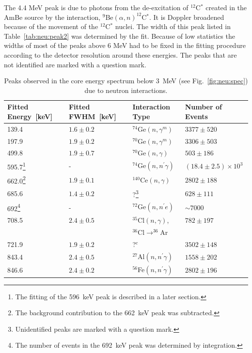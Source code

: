 The 4.4 MeV peak is due to photons from the de-excitation of
$^{12}$C$^{*}$ created in the AmBe source by the interaction,
$^{9}$Be$(\alpha,n)^{12}$C$^{*}$. It is Doppler broadened because of
the movement of the $^{12}$C$^{*}$ nuclei. The width of this peak
listed in Table~\ref{tab:neu:peak2} was determined by the fit. Because
of low statistics the widths of most of the peaks above 6 MeV had to
be fixed in the fitting procedure according to the detector resolution
around these energies. The peaks that are not identified are marked
with a question mark.

\begin{table}[tbhp]
\centering
\caption{Peaks observed in the core energy spectrum below 3~MeV
(see Fig.~\ref{fig:neu:spec}) due to neutron interactions.} 
\label{tab:neu:peak}
\begin{minipage}{\linewidth}
\begin{tabular*}{\textwidth}{llll} \hline
Fitted Energy~[keV]& Fitted FWHM~[keV]& Interaction Type& Number of Events\\\hline
139.4 & $1.6 \pm 0.2$ & $^{74}$Ge$(n,\gamma^m)$ & $3377 \pm 520$ \\
197.9 & $1.9 \pm 0.2$ & $^{70}$Ge$(n,\gamma^m)$ & $3306 \pm 503$ \\
499.8 & $1.9 \pm 0.7$ & $^{70}$Ge$(n,\gamma)$   & $503  \pm 186$ \\
595.7\footnote{The fitting of the 596~keV peak is described in a later section.} & - & $^{74}$Ge$(n,n^\prime\gamma)$ & $(18.4 \pm 2.5)\times10^3$\\
662.0\footnote{The background contribution to the 662~keV peak was subtracted.} & $1.9 \pm 0.1$ & $^{140}$Ce$(n,\gamma)$ & $2802 \pm 188$ \\
685.6 & $1.4 \pm 0.2$ & ?\footnote{Unidentified peaks are marked with a question mark.} & $628  \pm 111$ \\
692\footnote{The number of events in the 692~keV peak was determined by integration.}  & - & $^{72}$Ge$(n,n^\prime e)$ & $\sim 7000$ \\
708.5  & $2.4 \pm 0.5$ & $^{35}$Cl$(n,\gamma)$,  & $782 \pm 197$ \\
&  & $^{36}$Cl$\rightarrow^{36}$Ar & \\
721.9  & $1.9 \pm 0.2$ & ?$^c$ & $3502 \pm 148$ \\
843.4  & $2.4 \pm 0.5$ & $^{27}$Al$(n,n^\prime\gamma)$ & $1558 \pm 202$ \\
846.6  & $2.4 \pm 0.2$ & $^{56}$Fe$(n,n^\prime\gamma)$ & $2802 \pm 196$ \\

\end{tabular*}
\end{minipage}
\end{table}
